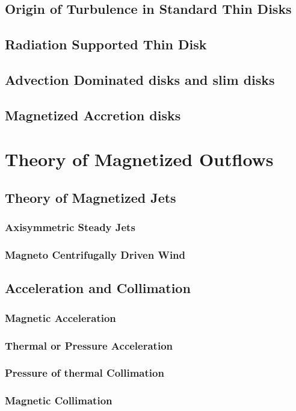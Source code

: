 \documentclass[10pt,a4paper]{article}
\begin{document}
\subsection{Origin of Turbulence in Standard Thin Disks}
\subsection{Radiation Supported Thin Disk}
\subsection{Advection Dominated disks and slim disks}
\subsection{Magnetized Accretion disks}

\section{Theory of Magnetized Outflows}
\subsection{Theory of Magnetized Jets}
\subsubsection{Axisymmetric Steady Jets}
\subsubsection{Magneto Centrifugally Driven Wind}
\subsection{Acceleration and Collimation}
\subsubsection{Magnetic Acceleration}
\subsubsection{Thermal or Pressure Acceleration}
\subsubsection{Pressure of thermal Collimation}
\subsubsection{Magnetic Collimation}
\end{document}
